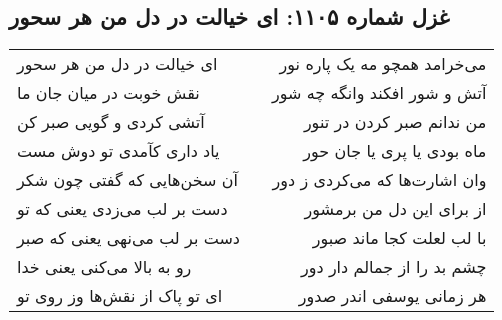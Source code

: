 \begin{center}
\section*{غزل شماره ۱۱۰۵: ای خیالت در دل من هر سحور}
\label{sec:1105}
\begin{longtable}{l p{0.5cm} r}
ای خیالت در دل من هر سحور
&&
می‌خرامد همچو مه یک پاره نور
\\
نقش خوبت در میان جان ما
&&
آتش و شور افکند وانگه چه شور
\\
آتشی کردی و گویی صبر کن
&&
من ندانم صبر کردن در تنور
\\
یاد داری کآمدی تو دوش مست
&&
ماه بودی یا پری یا جان حور
\\
آن سخن‌هایی که گفتی چون شکر
&&
وان اشارت‌ها که می‌کردی ز دور
\\
دست بر لب می‌زدی یعنی که تو
&&
از برای این دل من برمشور
\\
دست بر لب می‌نهی یعنی که صبر
&&
با لب لعلت کجا ماند صبور
\\
رو به بالا می‌کنی یعنی خدا
&&
چشم بد را از جمالم دار دور
\\
ای تو پاک از نقش‌ها وز روی تو
&&
هر زمانی یوسفی اندر صدور
\\
\end{longtable}
\end{center}
